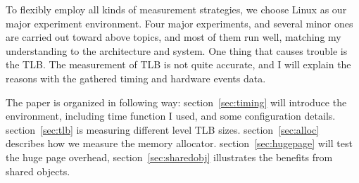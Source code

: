 To flexibly employ all kinds of measurement strategies, we choose Linux as our
major experiment environment. Four major experiments, and several minor ones
are carried out toward above topics, and most of them run well, matching my
understanding to the architecture and system. One thing that causes trouble is
the TLB. The measurement of TLB is not quite accurate, and I will explain the
reasons with the gathered timing and hardware events data.

The paper is organized in following way: section~\ref{sec:timing} will
introduce the environment, including time function I used, and some
configuration details. section~\ref{sec:tlb} is measuring different level TLB sizes.
section~\ref{sec:alloc} describes how we measure the memory allocator. section~\ref{sec:hugepage} will test
the huge page overhead, section~\ref{sec:sharedobj} illustrates the benefits from shared objects.

